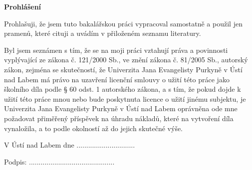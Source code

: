\thispagestyle{empty}
\addtocounter{page}{1} 

\textbf{Prohlášení}

\vspace{1cm}

Prohlašuji, že jsem tuto bakalářskou práci vypracoval samostatně a použil jen pramenů, které
cituji a uvádím v přiloženém seznamu literatury.

\vspace{0.5cm}

Byl jsem seznámen s tím, že se na moji práci vztahují práva a povinnosti vyplývající ze zákona
č. 121/2000 Sb., ve znění zákona č. 81/2005 Sb., autorský zákon, zejména se skutečností,
že Univerzita Jana Evangelisty Purkyně v Ústí nad Labem má právo na uzavření licenční
smlouvy o užití této práce jako školního díla podle § 60 odst. 1 autorského zákona, a s tím, že
pokud dojde k užití této práce mnou nebo bude poskytnuta licence o užití jinému subjektu,
je Univerzita Jana Evangelisty Purkyně v Ústí nad Labem oprávněna ode mne požadovat
přiměřený příspěvek na úhradu nákladů, které na vytvoření díla vynaložila, a to podle
okolností až do jejich skutečné výše.

\vspace{1cm}

\begin{multicols}{2}
    \begin{flushleft}
    V Ústí nad Labem dne ..............................
    \end{flushleft}

\newcolumn

\begin{flushright}
Podpis: ............................................
\end{flushright}


\end{multicols}

\newpage
